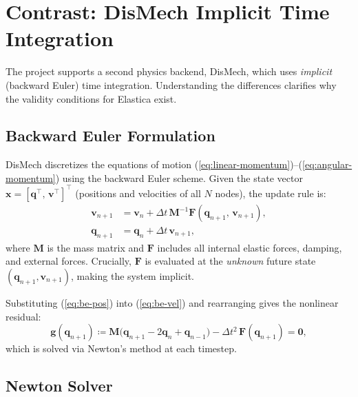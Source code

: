 \documentclass[11pt]{article}
\newcommand{\vect}[1]{\mathbf{#1}}
\newcommand{\mat}[1]{\mathbf{#1}}
\begin{document}
\section{Contrast: DisMech Implicit Time Integration}
\label{sec:dismech}

The project supports a second physics backend, DisMech, which uses
\emph{implicit} (backward Euler) time integration.  Understanding the
differences clarifies why the validity conditions for Elastica exist.

\subsection{Backward Euler Formulation}
\label{sec:backward-euler}

DisMech discretizes the equations of motion (\ref{eq:linear-momentum})--(\ref{eq:angular-momentum})
using the backward Euler scheme.  Given the state vector
$\vect{x} = [\vect{q}^\top,\, \vect{v}^\top]^\top$ (positions and velocities
of all $N$ nodes), the update rule is:
\begin{align}
  \vect{v}_{n+1} &= \vect{v}_n + \Delta t\,\mat{M}^{-1}\vect{F}(\vect{q}_{n+1},\, \vect{v}_{n+1}),
    \label{eq:be-vel} \\
  \vect{q}_{n+1} &= \vect{q}_n + \Delta t\,\vect{v}_{n+1},
    \label{eq:be-pos}
\end{align}
where $\mat{M}$ is the mass matrix and $\vect{F}$ includes all internal
elastic forces, damping, and external forces.  Crucially, $\vect{F}$ is
evaluated at the \emph{unknown} future state $(\vect{q}_{n+1}, \vect{v}_{n+1})$,
making the system implicit.

Substituting (\ref{eq:be-pos}) into (\ref{eq:be-vel}) and rearranging gives
the nonlinear residual:
\begin{equation}
  \vect{g}(\vect{q}_{n+1})
    \coloneqq \mat{M}\bigl(\vect{q}_{n+1} - 2\vect{q}_n + \vect{q}_{n-1}\bigr)
    - \Delta t^2\,\vect{F}(\vect{q}_{n+1})
    = \vect{0},
  \label{eq:residual}
\end{equation}
which is solved via Newton's method at each timestep.

\subsection{Newton Solver}
\label{sec:newton}
\end{document}
